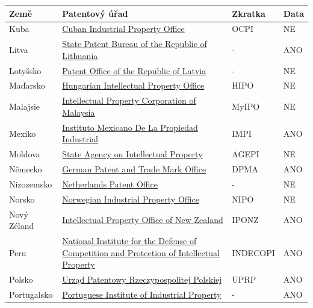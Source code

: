 	\begin{table}[H]
	\centering
	\begin{tabular}{|>{\centering\arraybackslash}p{2.2cm}|>{\centering\arraybackslash}p{7cm}|>{\centering\arraybackslash}p{2cm}|>{\centering\arraybackslash}p{1cm}|} 
	\hline
	\textbf{Země}    & \textbf{Patentový úřad} & \textbf{Zkratka}        & \textbf{Data}        \\ 
	\hline
	Kuba & \href{http://www.ocpi.cu}{Cuban Industrial Property Office}  & OCPI   & NE      \\ 
	\hline
	Litva & \href{http://vpb.lrv.lt/en/}{State Patent Bureau of the Republic of Lithuania}  & -    & ANO     \\
	\hline
 	Lotyšsko & \href{https://www.lrpv.gov.lv/lv}{Patent Office of the Republic of Latvia}  & -    & NE     \\ 
	\hline
	Maďarsko & \href{http://www.hipo.gov.hu/}{Hungarian Intellectual Property Office}  & HIPO   & NE      \\ 
	\hline
	Malajsie & \href{http://www.myipo.gov.my/}{Intellectual Property Corporation of Malaysia}  & MyIPO  & NE       \\ 
	\hline
	Mexiko & \href{https://www.gob.mx/impi/en}{Instituto Mexicano De La Propiedad Industrial}  & IMPI  & ANO       \\ 
	\hline
	Moldova & \href{http://www.agepi.gov.md/}{State Agency on Intellectual Property}  & AGEPI   & NE      \\ 
	\hline
	Německo & \href{http://www.dpma.de/}{German Patent and Trade Mark Office}  & DPMA   & ANO      \\ 
	\hline
	Nizozemsko & \href{http://www.rvo.nl/octrooien}{Netherlands Patent Office}  & -    & NE    \\ 
	\hline
	Norsko & \href{https://www.patentstyret.no/en/}{Norwegian Industrial Property Office}  & NIPO    & NE     \\ 
	\hline
	Nový Zéland & \href{http://www.iponz.govt.nz/}{Intellectual Property Office of New Zealand}  & IPONZ   & ANO      \\ 
	\hline
	Peru & \href{http://www.indecopi.gob.pe/}{National Institute for the Defense of Competition and Protection of Intellectual Property}  & INDECOPI    & ANO     \\ 
	\hline
	Polsko & \href{https://uprp.gov.pl/pl}{Urząd Patentowy Rzeczypospolitej Polskiej}  & UPRP    & ANO     \\ 
	\hline
	Portugalsko & \href{https://inpi.justica.gov.pt/}{Portuguese Institute of Industrial Property}  & -     & ANO    \\ 

\end{tabular}
\end{table}
